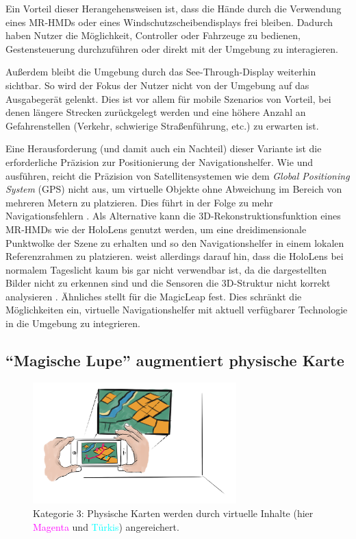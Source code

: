 Ein Vorteil dieser Herangehensweisen ist, dass die Hände durch die Verwendung eines MR-HMDs oder eines Windschutzscheibendisplays frei bleiben.
Dadurch haben Nutzer die Möglichkeit, Controller oder Fahrzeuge zu bedienen, Gestensteuerung durchzuführen oder direkt mit der Umgebung zu interagieren.

Außerdem bleibt die Umgebung durch das See-Through-Display weiterhin sichtbar.
So wird der Fokus der Nutzer nicht von der Umgebung auf das Ausgabegerät gelenkt.
Dies ist vor allem für mobile Szenarios von Vorteil, bei denen längere Strecken zurückgelegt werden und eine höhere Anzahl an Gefahrenstellen (Verkehr, schwierige Straßenführung, etc.) zu erwarten ist.

Eine Herausforderung (und damit auch ein Nachteil) dieser Variante ist die erforderliche Präzision zur Positionierung der Navigationshelfer.
Wie \citeauthor{Wiesner2017} und \citeauthor{Pfannmueller2015} ausführen, reicht die Präzision von Satellitensystemen wie dem \emph{Global Positioning System} (GPS) nicht aus, um virtuelle Objekte ohne Abweichung im Bereich von mehreren Metern zu platzieren.
Dies führt in der Folge zu mehr Navigationsfehlern \parencites[378]{Wiesner2017}{Pfannmueller2015}.
Als Alternative kann die 3D-Rekonstruktionsfunktion eines MR-HMDs wie der HoloLens genutzt werden, um eine dreidimensionale Punktwolke der Szene zu erhalten und so den Navigationshelfer in einem lokalen Referenzrahmen zu platzieren.
\citeauthor{Schroeder2017} weist allerdings darauf hin, dass die HoloLens bei normalem Tageslicht kaum bis gar nicht verwendbar ist, da die dargestellten Bilder nicht zu erkennen sind und die Sensoren die 3D-Struktur nicht korrekt analysieren \parencite[47]{Schroeder2017}.
Ähnliches stellt \citeauthor{Strange2018} für die MagicLeap fest.
Dies schränkt die Möglichkeiten ein, virtuelle Navigationshelfer mit aktuell verfügbarer Technologie in die Umgebung zu integrieren.

\subsection{\enquote{Magische Lupe} augmentiert physische Karte}
\begin{figure}[h]
    \centering
    \includegraphics[width=0.7\textwidth]{figures/sketch_ar_physical}
    \caption{Kategorie 3: Physische Karten werden durch virtuelle Inhalte (hier \textcolor{magenta}{Magenta} und \textcolor{cyan}{Türkis}) angereichert.}
    \label{fig:sketch_ar_physical}
\end{figure}


